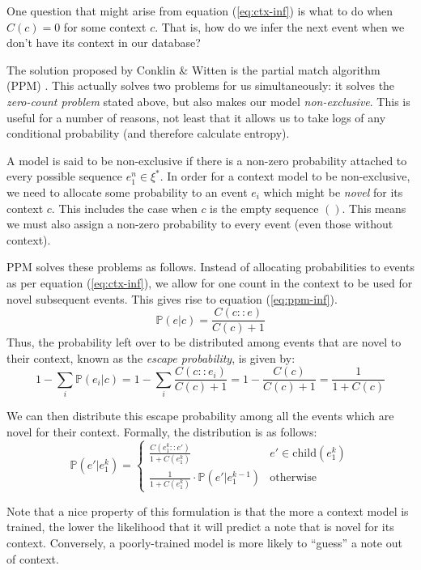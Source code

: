 \documentclass[12pt,a4paper,twoside]{article}
\begin{document}
One question that might arise from equation (\ref{eq:ctx-inf}) is what to do
when $C(c) = 0$ for some context $c$. That is, how do we infer the next event
when we don't have its context in our database?

The solution proposed by Conklin \& Witten is the partial match algorithm (PPM)
\cite{cleary1984ppm}. This actually solves two problems for us simultaneously:
it solves the \emph{zero-count problem} stated above, but also makes our
model \emph{non-exclusive}. This is useful for a number of reasons, not
least that it allows us to take logs of any conditional probability (and
therefore calculate entropy).

A model is said to be non-exclusive if there is a non-zero probability attached
to every possible sequence $e_{1}^n \in \xi^*$. In order for a context model to
be non-exclusive, we need to allocate some probability to an event $e_i$ which
might be \emph{novel} for its context $c$. This includes the case when $c$
is the empty sequence $()$. This means we must also assign a non-zero
probability to every event (even those without context).

PPM solves these problems as follows. Instead of allocating probabilities to
events as per equation (\ref{eq:ctx-inf}), we allow for one count in the context
to be used for novel subsequent events. This gives rise to equation
(\ref{eq:ppm-inf}).
\begin{equation}
  \mathbb{P}(e | c) = \frac{ C(c :: e) }{ C(c) + 1 } \label{eq:ppm-inf}
\end{equation} 
Thus, the probability left over to be distributed among events that are novel
to their context, known as the \emph{escape probability}, is given by:
$$ 1 - \sum_i \mathbb{P}(e_i | c) = 1 - 
\sum_i \frac{ C(c :: e_i) }{ C(c) + 1 } = 1 - \frac{ C(c) }{ C(c) + 1 } = \frac{
1 }{ 1 + C(c) } $$

We can then distribute this escape probability among all the events which are
novel for their context. Formally, the distribution is as follows:
$$ \mathbb{P}(e' | e_1^{k}) = \begin{cases}
  \frac{ C(e_1^{k} :: e') }{ 1 + C(e_1^k) } & e' \in
  \mathrm{child}(e_1^{k}) \\
  \frac{ 1 }{ 1 + C(e_1^{k}) } \cdot \mathbb{P}(e' | e_1^{k-1}) & \text{otherwise}
\end{cases} $$

Note that a nice property of this formulation is that the more a context model
is trained, the lower the likelihood that it will predict a note that is novel
for its context. Conversely, a poorly-trained model is more likely to ``guess''
a note out of context.
\end{document}
